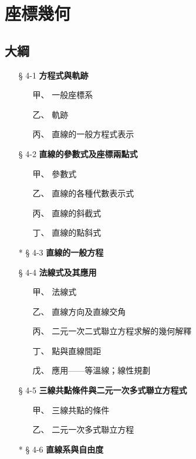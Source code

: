 \section{座標幾何}
\label{sec:b3_ch4}

\subsection*{大綱}

\begin{itemize}[leftmargin=2em]
  \item[§ 4-1] \textbf{方程式與軌跡}
  \begin{itemize}[leftmargin=2em]
    \item[甲、] 一般座標系
    \item[乙、] 軌跡
    \item[丙、] 直線的一般方程式表示
  \end{itemize}
  \item[§ 4-2] \textbf{直線的參數式及座標兩點式}
  \begin{itemize}[leftmargin=2em]
    \item[甲、] 參數式
    \item[乙、] 直線的各種代數表示式
    \item[丙、] 直線的斜截式
    \item[丁、] 直線的點斜式
  \end{itemize}
  \item[* § 4-3] \textbf{直線的一般方程}
  \item[§ 4-4] \textbf{法線式及其應用}
  \begin{itemize}[leftmargin=2em]
    \item[甲、] 法線式
    \item[乙、] 直線方向及直線交角
    \item[丙、] 二元一次二式聯立方程求解的幾何解釋
    \item[丁、] 點與直線間距
    \item[戊、] 應用——等溫線；線性規劃
  \end{itemize}
  \item[§ 4-5] \textbf{三線共點條件與二元一次多式聯立方程式}
  \begin{itemize}[leftmargin=2em]
    \item[甲、] 三線共點的條件
    \item[乙、] 二元一次多式聯立方程
  \end{itemize}
  \item[* § 4-6] \textbf{直線系與自由度}
  \begin{itemize}[leftmargin=2em]

\end{itemize}
\end{itemize}
